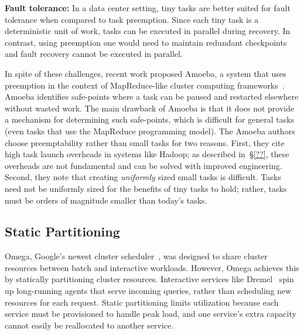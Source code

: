 
\vspace{4pt}\noindent\textbf{Fault tolerance:}
In a data center setting, tiny tasks are better suited for
fault tolerance when compared to task preemption. Since each tiny task is a
deterministic unit of work, tasks can be executed in parallel during recovery.
In contrast, using preemption one would need to maintain redundant checkpoints
and fault recovery cannot be executed in parallel.

In spite of these challenges, recent work proposed Amoeba, a system that
uses preemption
in the context of MapReduce-like cluster computing frameworks~\cite{anathanarayanan2012true}. Amoeba
identifies safe-points where a task can be paused and restarted elsewhere
without wasted work. The main drawback of Amoeba is that it does not provide a mechanism for determining
such safe-points, which is difficult for general tasks (even tasks that
use the MapReduce programming model).
The Amoeba authors choose preemptability rather than small tasks for two
reasons. First, they cite high task launch overheads in systems like
Hadoop; as described in~\S\ref{??}, these overheads are not fundamental and
can be solved with improved engineering. Second, they note that creating
\emph{uniformly} sized small tasks is difficult. Tasks need not be uniformly
sized for the benefits of tiny tasks to hold; rather, tasks must be
orders of magnitude smaller than today's tasks.

\subsection{Static Partitioning}
Omega, Google's newest cluster scheduler~\cite{melnik2010dremel},
was designed to share cluster
resources between batch and interactive workloads. However, Omega achieves
this by
statically partitioning cluster resources.
Interactive services like Dremel~\cite{melnik2010dremel} spin up long-running
agents that serve incoming queries, rather than scheduling new resources for
each request.  Static partitioning limits utilization because each service
must be provisioned to handle peak load, and one service's extra capacity
cannot easily be reallocated to another service.

